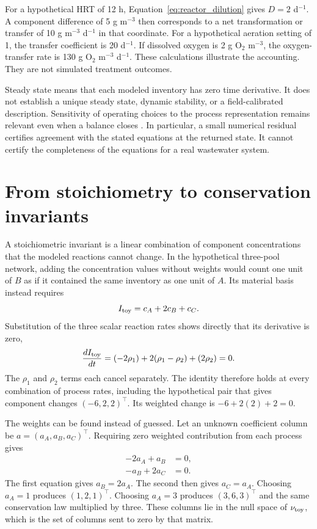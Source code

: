 For a hypothetical HRT of 12 h, Equation~\eqref{eq:reactor_dilution} gives $D=2$ d$^{-1}$. A component difference of 5 g m$^{-3}$ then corresponds to a net transformation or transfer of 10 g m$^{-3}$ d$^{-1}$ in that coordinate. For a hypothetical aeration setting of 1, the transfer coefficient is 20 d$^{-1}$. If dissolved oxygen is 2 g O$_2$ m$^{-3}$, the oxygen-transfer rate is 130 g O$_2$ m$^{-3}$ d$^{-1}$. These calculations illustrate the accounting. They are not simulated treatment outcomes.

Steady state means that each modeled inventory has zero time derivative. It does not establish a unique steady state, dynamic stability, or a field-calibrated description. Sensitivity of operating choices to the process representation remains relevant even when a balance closes \citep{Araujo2013}. In particular, a small numerical residual certifies agreement with the stated equations at the returned state. It cannot certify the completeness of the equations for a real wastewater system.

\section{From stoichiometry to conservation invariants}

A stoichiometric invariant is a linear combination of component concentrations that the modeled reactions cannot change. In the hypothetical three-pool network, adding the concentration values without weights would count one unit of $B$ as if it contained the same inventory as one unit of $A$. Its material basis instead requires
\[
I_{\rm toy}=c_A+2c_B+c_C.
\]
Substitution of the three scalar reaction rates shows directly that its derivative is zero,
\[
\frac{d I_{\rm toy}}{dt}
=(-2\rho_1)+2(\rho_1-\rho_2)+(2\rho_2)=0.
\]
The $\rho_1$ and $\rho_2$ terms each cancel separately. The identity therefore holds at every combination of process rates, including the hypothetical pair that gives component changes $(-6,2,2)^\top$. Its weighted change is $-6+2(2)+2=0$.

The weights can be found instead of guessed. Let an unknown coefficient column be $a=(a_A,a_B,a_C)^\top$. Requiring zero weighted contribution from each process gives
\[
\begin{aligned}
-2a_A+a_B&=0,\\
-a_B+2a_C&=0.
\end{aligned}
\]
The first equation gives $a_B=2a_A$. The second then gives $a_C=a_A$. Choosing $a_A=1$ produces $(1,2,1)^\top$. Choosing $a_A=3$ produces $(3,6,3)^\top$ and the same conservation law multiplied by three. These columns lie in the null space of $\nu_{\rm toy}$, which is the set of columns sent to zero by that matrix.

